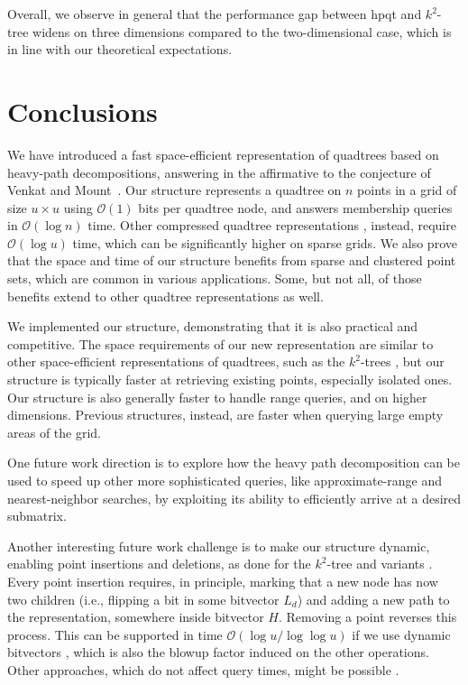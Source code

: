 \documentclass{elsarticle}
\newcommand{\Oh}[1]
  {\ensuremath{\mathcal{O}\!\left( {#1} \right)}}
\newcommand{\kt}{$k^2$-tree\xspace}
\newcommand{\hpqt}{\textsf{hpqt}\xspace}
\begin{document}
Overall, we observe in general that the performance gap between \hpqt and \kt widens on three dimensions compared to the two-dimensional case, which is in line with our theoretical expectations.

\section{Conclusions}
\label{sec:conclusions}

We have introduced a fast space-efficient representation of quadtrees based on heavy-path decompositions, answering in the affirmative to the conjecture of Venkat and Mount~\cite{VM14}. Our structure represents a quadtree on $n$ points in a grid of size $u \times u$ using $\Oh{1}$ bits per quadtree node, and answers membership queries in $\Oh{\log n}$ time. Other compressed quadtree representations \cite{BLN14,VM14}, instead, require $\Oh{\log u}$ time, which can be significantly higher on sparse grids. We also prove that the space and time of our structure benefits from sparse and clustered point sets, which are common in various applications. Some, but not all, of those benefits extend to other quadtree representations as well.

We implemented our structure, demonstrating that it is also practical and competitive. The space requirements of our new representation are similar to other space-efficient representations of quadtrees, such as the $k^2$-trees \cite{BLN14}, but our structure is typically faster at retrieving existing points, especially isolated ones. Our structure is also generally faster to handle range queries, and on higher dimensions. Previous structures, instead, are faster when querying large empty areas of the grid.

One future work direction is to explore how the heavy path decomposition can be used to speed up other more sophisticated queries, like approximate-range and nearest-neighbor searches, by exploiting its ability to efficiently arrive at a desired submatrix.

Another interesting future work challenge is to make our structure dynamic, enabling point insertions and deletions, as done for the \kt and variants \cite{VM14,BCPdBN17,AdBGN19}. Every point insertion requires, in principle, marking that a new node has now two children (i.e., flipping a bit in some bitvector $L_d$) and adding a new path to the representation, somewhere inside bitvector $H$. Removing a point reverses this process. This can be supported in time $\Oh{\log u / \log\log u}$ if we use dynamic bitvectors \cite{NS12}, which is also the blowup factor induced on the other operations. Other approaches, which do not affect query times, might be possible \cite{CFRdBLN20}.
\end{document}
